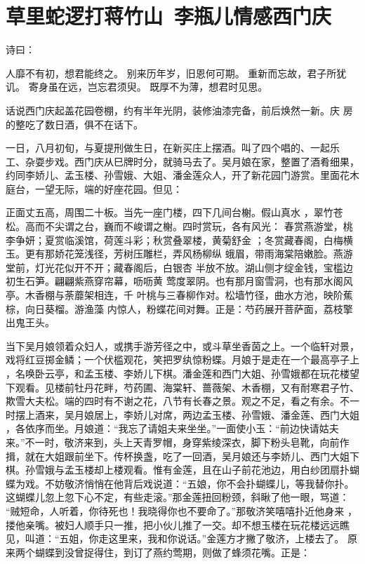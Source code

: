\chapter{草里蛇逻打蒋竹山~李瓶儿情感西门庆}

诗曰：

人靡不有初，想君能终之。
别来历年岁，旧恩何可期。
重新而忘故，君子所犹讥。
寄身虽在远，岂忘君须臾。
既厚不为薄，想君时见思。

话说西门庆起盖花园卷棚，约有半年光阴，装修油漆完备，前后焕然一新。庆
房的整吃了数日酒，俱不在话下。

一日，八月初旬，与夏提刑做生日，在新买庄上摆酒。叫了四个唱的、一起乐
工、杂耍步戏。西门庆从巳牌时分，就骑马去了。吴月娘在家，整置了酒肴细果，
约同李娇儿、孟玉楼、孙雪娥、大姐、潘金莲众人，开了新花园门游赏。里面花木
庭台，一望无际，端的好座花园。但见：

正面丈五高，周围二十板。当先一座门楼，四下几间台榭。假山真水
，翠竹苍松。高而不尖谓之台，巍而不峻谓之榭。四时赏玩，各有风光：
春赏燕游堂，桃李争妍；夏赏临溪馆，荷莲斗彩；秋赏叠翠楼，黄菊舒金
；冬赏藏春阁，白梅横玉。更有那娇花笼浅径，芳树压雕栏，弄风杨柳纵
蛾眉，带雨海棠陪嫩脸。燕游堂前，灯光花似开不开；藏春阁后，白银杏
半放不放。湖山侧才绽金钱，宝槛边初生石笋。翩翩紫燕穿帘幕，呖呖黄
莺度翠阴。也有那月窗雪洞，也有那水阁风亭。木香棚与荼蘼架相连，千
叶桃与三春柳作对。松墙竹径，曲水方池，映阶蕉棕，向日葵榴。游渔藻
内惊人，粉蝶花间对舞。正是：芍药展开菩萨面，荔枝擎出鬼王头。

当下吴月娘领着众妇人，或携手游芳径之中，或斗草坐香茵之上。一个临轩对景，
戏将红豆掷金鳞；一个伏槛观花，笑把罗纨惊粉蝶。月娘于是走在一个最高亭子上
，名唤卧云亭，和孟玉楼、李娇儿下棋。潘金莲和西门大姐、孙雪娥都在玩花楼望
下观看。见楼前牡丹花畔，芍药圃、海棠轩、蔷薇架、木香棚，又有耐寒君子竹、
欺雪大夫松。端的四时有不谢之花，八节有长春之景。观之不足，看之有余。不一
时摆上酒来，吴月娘居上，李娇儿对席，两边孟玉楼、孙雪娥、潘金莲、西门大姐
，各依序而坐。月娘道：“我忘了请姐夫来坐坐。”一面使小玉：“前边快请姑夫
来。”不一时，敬济来到，头上天青罗帽，身穿紫绫深衣，脚下粉头皂靴，向前作
揖，就在大姐跟前坐下。传杯换盏，吃了一回酒，吴月娘还与李娇儿、西门大姐下
棋。孙雪娥与孟玉楼却上楼观看。惟有金莲，且在山子前花池边，用白纱团扇扑蝴
蝶为戏。不妨敬济悄悄在他背后戏说道：“五娘，你不会扑蝴蝶儿，等我替你扑。
这蝴蝶儿忽上忽下心不定，有些走滚。”那金莲扭回粉颈，斜瞅了他一眼，骂道：
“贼短命，人听着，你待死也！我晓得你也不要命了。”那敬济笑嘻嘻扑近他身来
，搂他亲嘴。被妇人顺手只一推，把小伙儿推了一交。却不想玉楼在玩花楼远远瞧
见，叫道：“五姐，你走这里来，我和你说话。”金莲方才撇了敬济，上楼去了。
原来两个蝴蝶到没曾捉得住，到订了燕约莺期，则做了蜂须花嘴。正是：

